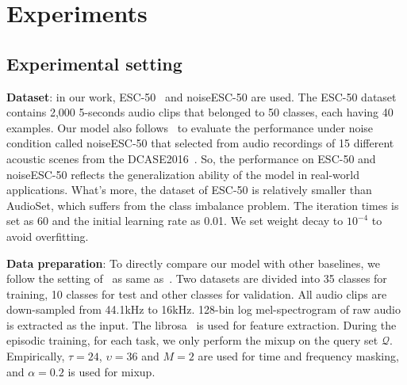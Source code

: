 \documentclass[a4paper]{article}
\begin{document}
\section{Experiments}


\subsection{Experimental setting}
\vspace{-1mm}
\textbf{Dataset}: in our work, ESC-50~\cite{ESC_dataset_50} and noiseESC-50 are used. The ESC-50 dataset contains 2,000 5-seconds audio clips that belonged to 50 classes, each having 40 examples. 
Our model also follows~\cite{attentionSimilarity} to evaluate the performance under noise condition called noiseESC-50 that selected from audio recordings of 15 different acoustic scenes from the DCASE2016~\cite{TUTDatatbase}.
So, the performance on ESC-50 and noiseESC-50 reflects the generalization ability of the model in real-world applications. 
What's more, the dataset of ESC-50 is relatively smaller than AudioSet, which suffers from the class imbalance problem. 
The iteration times is set as 60 and the initial learning rate as 0.01. We set weight decay to $10^{-4}$ to avoid overfitting.

\noindent\textbf{Data preparation}: To directly compare our model with other baselines, we follow the setting of~\cite{MatchNet} as same as~\cite{attentionSimilarity}. Two datasets are divided into 35 classes for training, 10 classes for test and other classes for validation. All audio clips are down-sampled from 44.1kHz to 16kHz. 128-bin log mel-spectrogram of raw audio is extracted as the input. The librosa~\cite{librosa} is used for feature extraction. During the episodic training, for each task, we only perform the mixup on the query set $\mathcal{Q}$.  
Empirically, $\tau=24$, $\upsilon=36$ and $M=2$ are used for time and frequency masking, and $\alpha=0.2$  is used for mixup.
\vspace{-1mm}
\end{document}
